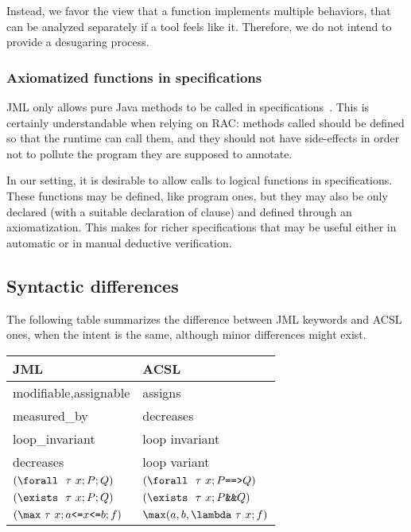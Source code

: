 Instead, we favor the view that a function implements multiple
behaviors, that can be analyzed separately if a tool feels like
it. Therefore, we do not intend to provide a desugaring process.

\subsubsection*{Axiomatized functions in specifications}

JML only allows pure Java methods to be called in
specifications~\cite{leavens00preliminary}. This is certainly
understandable when relying on RAC: methods called should be defined
so that the runtime can call them, and they should not have
side-effects in order not to pollute the program they are supposed to
annotate. 

In our setting, it is desirable to allow calls to logical functions in
specifications. These functions may be defined, like program ones, but
they may also be only declared (with a suitable declaration of \reads
clause) and defined through an axiomatization. 
This makes for richer specifications that may be useful either in
automatic or in manual deductive verification.

\subsection{Syntactic differences}

The following table summarizes the difference between JML keywords and
ACSL ones, when the intent is the same, although minor differences
might exist.

\begin{center}
\begin{tabular}{|l|l|}
\hline
  JML                  & ACSL \\ \hline
  modifiable,assignable           & assigns \\
  measured\_by         & decreases \\
  loop\_invariant      & loop invariant \\
  decreases            & loop variant \\
  $(\texttt{{\textbackslash}forall}~~\tau~x ; P ; Q)$ &   $(\Forall~\tau~x ; P \verb|==>| Q)$ \\
  $(\texttt{{\textbackslash}exists}~~\tau~x ; P ; Q)$ &   $(\Exists~\tau~x ; P \verb|&&| Q)$ \\
  $(\verb|\max|~\tau~x ; a \verb|<=| x \verb|<=| b ; f)$ &   
  $\verb|\max|(a,b,\verb|\lambda|~\tau~x ; f)$ \\
  \hline
\end{tabular}
\end{center}





